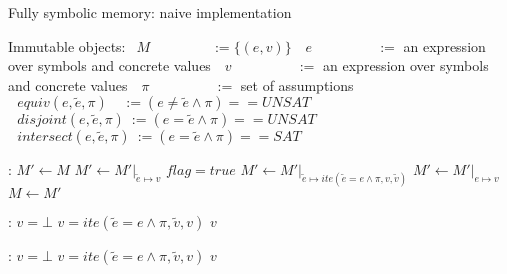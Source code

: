 \documentclass{article}
\begin{document}
\begin{algorithm}
  \normalsize

  \caption{Fully symbolic memory: naive implementation}
  \begin{algorithmic}
  	\State Immutable objects:
  	\State $~~M~~~~~~~~~~~~~~~~~~~\,:= \{(e,v)\}$ 
  	\State $~~~e~~~~~~~~~~~~~~~~~~~\,~:=$ an expression over symbols and concrete values
  	\State $~~~v~~~~~~~~~~~~~~~~~~~~\,:=$ an expression over symbols and concrete values
  	\State $~~~\pi~~~~~~~~~~~~~~~~~~~~\,:=$ set of assumptions
  	\State $~~~equiv(e, \widetilde{e}, \pi)~~~~\,:= (e \not = \widetilde{e} \wedge \pi) == UNSAT$ 
  	\State $~~~disjoint(e, \widetilde{e}, \pi)~:=  (e = \widetilde{e} \wedge \pi) == UNSAT$ 
  	\State $~~~intersect(e, \widetilde{e}, \pi)~:=  (e = \widetilde{e} \wedge \pi) == SAT$ 

  \end{algorithmic}
  \bigskip
  \begin{algorithmic}[1]
	:
		\State $M'  \leftarrow M$
	    		\State $M' \leftarrow M'\vert_{\widetilde{e} \mapsto v}$
	    		\State $flag = true$
	    	\Else
	    		\State $M' \leftarrow M'\vert_{\widetilde{e} \mapsto ite(\widetilde{e} = e \wedge \pi, v, \widetilde{v})}$
	    	\EndIf
	    \EndFor
	    	\State $M' \leftarrow M'\vert_{e \mapsto v}$
	    \EndIf
	    \State $M  \leftarrow M'$
	\EndFunction
  \end{algorithmic}
  
  \bigskip

  \begin{algorithmic}[1]
	:
		\State $v = \bot$ 
				\State $v = ite(\widetilde{e} = e \wedge \pi, \widetilde{v}, v)$
			\EndIf
		\EndFor
		\State \Return $v$
	\EndFunction
  \end{algorithmic}

  \bigskip

  \begin{algorithmic}[1]
	:
		\State $v = \bot$ 
				\State $v = ite(\widetilde{e} = e \wedge \pi, \widetilde{v}, v)$
			\EndIf
		\EndFor
		\State \Return $v$
	\EndFunction
  \end{algorithmic}
  \bigskip
  
\end{algorithm}
\end{document}

